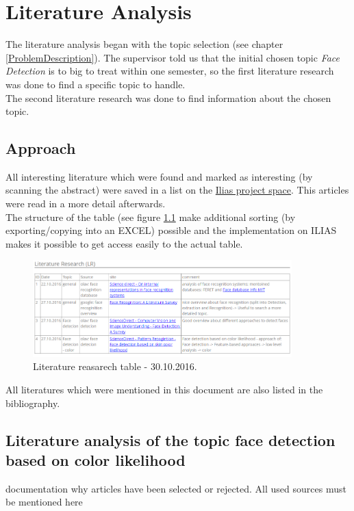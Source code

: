 \documentclass[Bachelorarbeit.tex]{subfiles}
\begin{document}
\chapter{Literature Analysis}
The literature analysis began with the topic selection (see chapter \ref{ProblemDescription}). The supervisor told us that the initial chosen topic \textit{Face Detection} is to big to treat within one semester, so the first literature research was done to find a specific topic to handle.\\
The second literature research was done to find information about the chosen topic.
\section{Approach}
All interesting literature which were found and marked as interesting (by scanning the abstract) were saved in a list on the \href{https://ilias.fhv.at/goto.php?target=wiki_298249_Literature_Research_%28LR%29}{Ilias project space}. This articles were read in a more detail afterwards.\\
The structure of the table (see figure \ref{LRT}  make additional sorting (by exporting/copying into an EXCEL) possible and the implementation on ILIAS makes it possible to get access easily to the actual table.

\begin{figure}[!h] %
\centering
\includegraphics[width=10cm]{./pictures/LR_20161030}
\caption{Literature reasarech table - 30.10.2016. \label{LRT}}
\end{figure}

All literatures which were mentioned in this document are also listed in the bibliography.

\section{Literature analysis of the topic face detection based on color likelihood}
documentation why articles have been selected or rejected. All
used sources must be mentioned here
\end{document}
